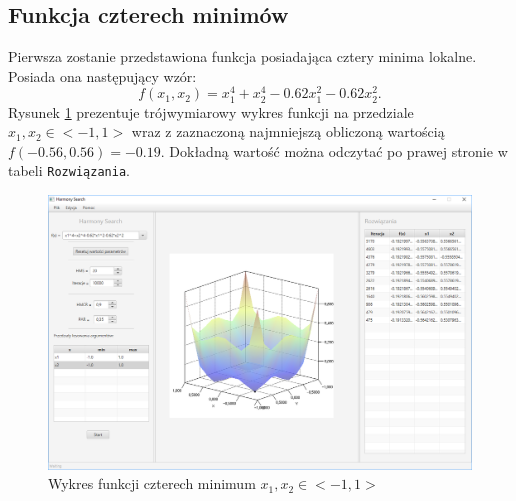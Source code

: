 \documentclass[10pt, a4paper]{article}
\begin{document}
\subsection{Funkcja czterech minimów}
\label{subsec:fcn4min}
Pierwsza zostanie przedstawiona funkcja posiadająca cztery minima lokalne. Posiada ona następujący wzór: $$f(x_{1},x_{2}) = x_{1}^{4}+x_{2}^{4}-0.62x_{1}^{2}-0.62x_{2}^{2}. $$  Rysunek \ref{fig:11} prezentuje trójwymiarowy wykres funkcji na przedziale $x_{1}, x_{2} \in <-1,1>$ wraz z zaznaczoną najmniejszą obliczoną wartością $f(-0.56,0.56)=-0.19$. Dokładną wartość można odczytać po prawej stronie w tabeli {\tt Rozwiązania}. 
\begin{figure}[htbp]
	\centering
		\includegraphics[width=.9\textwidth]{images/11.PNG}
		\caption{Wykres funkcji czterech minimum $x_{1}, x_{2} \in <-1,1>$}
		\label{fig:11}
\end{figure}
\end{document}
